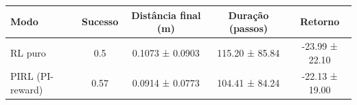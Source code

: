 \begin{tabular}{lcccc}
\hline
\textbf{Modo} & \textbf{Sucesso} & \textbf{Distância final (m)} & \textbf{Duração (passos)} & \textbf{Retorno} \\
\hline
RL puro & 0.5 & 0.1073 ± 0.0903 & 115.20 ± 85.84 & -23.99 ± 22.10 \\
PIRL (PI-reward) & 0.57 & 0.0914 ± 0.0773 & 104.41 ± 84.24 & -22.13 ± 19.00 \\
\hline
\end{tabular}
